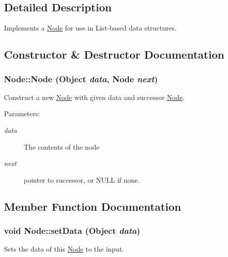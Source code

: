 \subsection{Detailed Description}
Implements a \hyperlink{class_node}{Node} for use in List-based data structures. 

\subsection{Constructor \& Destructor Documentation}
\hypertarget{class_node_2ccb948b5d0fc3a3192177a1fc635b04}{
\subsubsection[{Node}]{\setlength{\rightskip}{0pt plus 5cm}Node::Node (Object {\em data}, \/  {\bf Node} {\em next})}}
\label{class_node_2ccb948b5d0fc3a3192177a1fc635b04}


Construct a new \hyperlink{class_node}{Node} with given data and successor \hyperlink{class_node}{Node}. 

\begin{Desc}
\item[Parameters:]
\begin{description}
\item[{\em data}]The contents of the node \item[{\em next}]pointer to successor, or NULL if none. \end{description}
\end{Desc}


\subsection{Member Function Documentation}
\hypertarget{class_node_809b0b9da2979c91cc4210cf6e90d528}{
\subsubsection[{setData}]{\setlength{\rightskip}{0pt plus 5cm}void Node::setData (Object {\em data})}}
\label{class_node_809b0b9da2979c91cc4210cf6e90d528}


Sets the data of this \hyperlink{class_node}{Node} to the input. 

